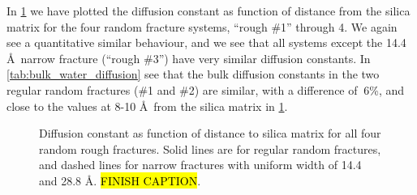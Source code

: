 In \cref{fig:diffusion_rough_systems} we have plotted the diffusion constant as function of distance from the silica matrix for the four random fracture systems, ``rough \#1'' through 4. We again see a quantitative similar behaviour, and we see that all systems except the 14.4 \AA\ narrow fracture (``rough \#3'') have very similar diffusion constants. In \cref{tab:bulk_water_diffusion} see that the bulk diffusion constants in the two regular random fractures (\#1 and \#2) are similar, with a difference of $~6$\%, and close to the values at 8-10 \AA\ from the silica matrix in \cref{fig:diffusion_rough_systems}.%
%
%
%
\begin{figure}[htpb]%
    \begin{minipage}[t]{0.499\textwidth}%
        \captionsetup{width=0.925\textwidth}%
        \centering%
        \caption{%
            Diffusion constant as function of distance to silica matrix for all four reference systems (flat pores). The solid lines are for the two systems with 86 \AA\ wide pores, and the dashed lines for narrow fractures of 14.4 and 28.8 \AA. \hl{FINISH CAPTION}. %
            \label{fig:diffusion_reference_systems}%
        }%
    \end{minipage}%
    \hfill%
    \begin{minipage}[t]{0.499\textwidth}%
        \captionsetup{width=0.925\textwidth}%
        \centering%
        \caption{%
            Diffusion constant as function of distance to silica matrix for all four random rough fractures. Solid lines are for regular random fractures, and dashed lines for narrow fractures with uniform width of 14.4 and 28.8 \AA. \hl{FINISH CAPTION}. %
            \label{fig:diffusion_rough_systems}%
        }%
    \end{minipage}%
\end{figure}%

